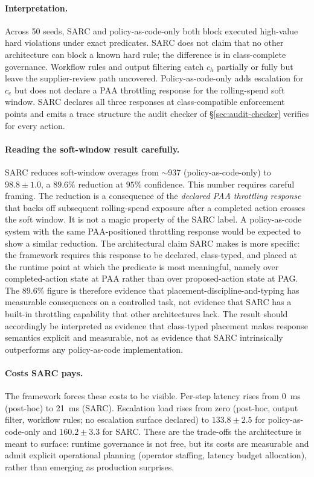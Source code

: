 \documentclass[11pt,a4paper]{article}
\theoremstyle{remark}
\begin{document}
\paragraph{Interpretation.} Across 50 seeds, SARC and policy-as-code-only both block executed high-value hard violations under exact predicates. SARC does not claim that no other architecture can block a known hard rule; the difference is in class-complete governance. Workflow rules and output filtering catch $c_h$ partially or fully but leave the supplier-review path uncovered. Policy-as-code-only adds escalation for $c_e$ but does not declare a PAA throttling response for the rolling-spend soft window. SARC declares all three responses at class-compatible enforcement points and emits a trace structure the audit checker of \S\ref{sec:audit-checker} verifies for every action.

\paragraph{Reading the soft-window result carefully.} SARC reduces soft-window overages from $\sim$937 (policy-as-code-only) to $98.8 \pm 1.0$, a $89.6\%$ reduction at $95\%$ confidence. This number requires careful framing. The reduction is a consequence of the \emph{declared PAA throttling response} that backs off subsequent rolling-spend exposure after a completed action crosses the soft window. It is not a magic property of the SARC label. A policy-as-code system with the same PAA-positioned throttling response would be expected to show a similar reduction. The architectural claim SARC makes is more specific: the framework requires this response to be declared, class-typed, and placed at the runtime point at which the predicate is most meaningful, namely over completed-action state at PAA rather than over proposed-action state at PAG. The 89.6\% figure is therefore evidence that placement-discipline-and-typing has measurable consequences on a controlled task, not evidence that SARC has a built-in throttling capability that other architectures lack. The result should accordingly be interpreted as evidence that class-typed placement makes response semantics explicit and measurable, not as evidence that SARC intrinsically outperforms any policy-as-code implementation.

\paragraph{Costs SARC pays.} The framework forces these costs to be visible. Per-step latency rises from 0~ms (post-hoc) to 21~ms (SARC). Escalation load rises from zero (post-hoc, output filter, workflow rules; no escalation surface declared) to $133.8 \pm 2.5$ for policy-as-code-only and $160.2 \pm 3.3$ for SARC. These are the trade-offs the architecture is meant to surface: runtime governance is not free, but its costs are measurable and admit explicit operational planning (operator staffing, latency budget allocation), rather than emerging as production surprises.
\end{document}
